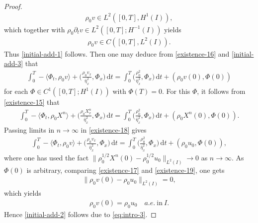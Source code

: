 \documentclass[11pt, reqno]{amsart}
\newcommand{\diff}{\mathrm{d}}
\numberwithin{equation}{section}
\begin{document}
{\begin{proof}
\begin{equation*}
\begin{aligned}
\rho_0v\in L^2([0,T],H^1(I)),
	\end{aligned}
\end{equation*}
which together with \(\rho_0\partial_tv\in L^2([0,T];H^{-1}(I))\) yields 
\begin{equation}\label{initial-add-3}
	\begin{aligned} 
\rho_0v\in C([0,T],L^2(I)).
	\end{aligned}
\end{equation}
Thus \eqref{initial-add-1} follows. 
Then one may deduce from \eqref{existence-16} and \eqref{initial-add-3} that  
\begin{equation}\label{existence-17}
	\begin{aligned}
		\int_0^T-\langle\Phi_t, \rho_0v\rangle+\bigg(\frac{\rho_0v_x}{\bar{\eta}_x^2}, \Phi_x\bigg)\,\diff t=\int_0^T\bigg({\frac{\rho_0^2}{\bar{\eta}_x^2}}, \Phi_x\bigg)\,\diff t+(\rho_0v(0), \Phi(0))
	\end{aligned}
\end{equation}
for each \(\Phi\in C^1([0,T]; H^1(I))\) with \(\Phi(T)=0\). For this \(\Phi\), it follows from \eqref{existence-15} that 
\begin{equation}\label{existence-18}
	\begin{aligned}
		\int_0^T-\langle\Phi_t, \rho_0X^n\rangle+\bigg(\frac{\rho_0X_x^n}{\bar{\eta}_x^2}, \Phi_x\bigg)\,\diff t=\int_0^T\bigg({\frac{\rho_0^2}{\bar{\eta}_x^2}}, \Phi_x\bigg)\,\diff t+(\rho_0X^n(0), \Phi(0)).
	\end{aligned}
\end{equation}
Passing limits in \(n\to \infty\) in \eqref{existence-18} gives 
\begin{equation}\label{existence-19}
	\begin{aligned}
		\int_0^T-\langle\Phi_t, \rho_0v\rangle+\bigg(\frac{\rho_0v_x}{\bar{\eta}_x^2}, \Phi_x\bigg)\,\diff t=\int_0^T\bigg({\frac{\rho_0^2}{\bar{\eta}_x^2}}, \Phi_x\bigg)\,\diff t+(\rho_0u_0, \Phi(0)),
	\end{aligned}
\end{equation}
where one has used the fact \(\|\rho_0^{1/2}X^n(0)-\rho_0^{1/2}u_0\|_{L^2(I)}\to 0\) as \(n\to\infty\). As \(\Phi(0)\) is arbitrary, comparing \eqref{existence-17} and \eqref{existence-19}, one gets 
\begin{equation*}
	\begin{aligned}
		\|\rho_0v(0)-\rho_0u_0\|_{L^2(I)}=0,
	\end{aligned}
\end{equation*}
which yields
\begin{equation*}
	\begin{aligned}
		\rho_0v(0)=\rho_0u_0\quad a.e.\ \text{in}\ I.
	\end{aligned}
\end{equation*}
Hence \eqref{initial-add-2} follows due to \eqref{eq:intro-3}.


\end{proof}}
\end{document}
